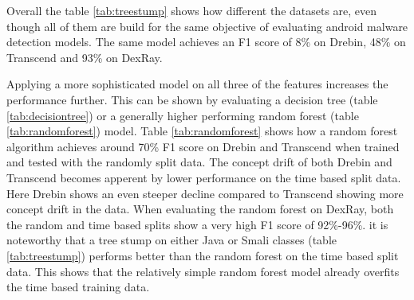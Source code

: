 Overall the table \ref{tab:treestump} shows how different the datasets are, 
even though all of them are build for the same objective of evaluating android malware 
detection models.
The same model achieves an F1 score of 8\% on Drebin, 48\% on Transcend and 93\% on DexRay.

\begin{table}[t]
    \caption{\label{tab:randomforest}%
    Random Forest (n\_estimators=300, max\_depth=25) results by dataset and split. Features include Java classes, Smali classes, and APK Size.}
\end{table}

Applying a more sophisticated model on all three of the features increases the performance further.
This can be shown by evaluating a decision tree (table \ref{tab:decisiontree}) or a generally higher performing random forest (table \ref{tab:randomforest}) model. 
Table \ref{tab:randomforest} shows how a random forest algorithm achieves around 70\% F1 score on Drebin and Transcend when 
trained and tested with the randomly split data.
The concept drift of both Drebin and Transcend becomes apperent by lower performance on the time based split data.
Here Drebin shows an even steeper decline compared to Transcend showing more concept drift in the data.
When evaluating the random forest on DexRay, both the random and time based splits show a very high F1 score of 92\%-96\%.
it is noteworthy that a tree stump on either Java or Smali classes (table \ref{tab:treestump}) performs better than the random forest on the time based split data.
This shows that the relatively simple random forest model already overfits the time based training data.

